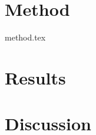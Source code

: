 \documentclass[12pt, a4paper]{report}
\begin{document}
\chapter{Method}
{method.tex}

\chapter{Results}

\chapter{Discussion}

\onecolumn
{}
\printbibliography[title = {References}]
\end{document}
